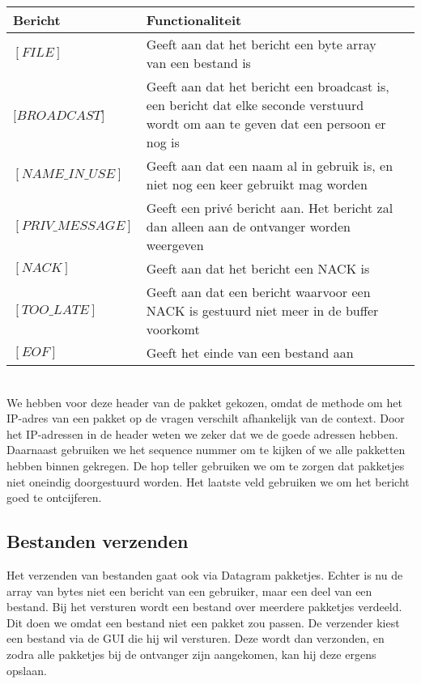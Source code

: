 \documentclass{article}
\begin{document}
\begin{tabular}{l  p{6cm}l }
Bericht & Functionaliteit \\
\hline
$[FILE]$ & Geeft aan dat het bericht een byte array van een bestand is \\
$[BROADCAST$] & Geeft aan dat het bericht een broadcast is, een bericht dat elke seconde verstuurd wordt om aan te geven dat een persoon er nog is \\
$[NAME\_IN\_USE]$ & Geeft aan dat een naam al in gebruik is, en niet nog een keer gebruikt mag worden \\
$[PRIV\_MESSAGE]$ & Geeft een priv\'{e} bericht aan. Het bericht zal dan alleen aan de ontvanger worden weergeven \\
$[NACK]$ & Geeft aan dat het bericht een NACK is \\
$[TOO\_LATE]$ & Geeft aan dat een bericht waarvoor een NACK is gestuurd niet meer in de buffer voorkomt \\
$[EOF]$ & Geeft het einde van een bestand aan
\end{tabular}
\\
We hebben voor deze header van de pakket gekozen, omdat de methode om het IP-adres van een pakket op de vragen verschilt afhankelijk van de context. Door het IP-adressen in de header weten we zeker dat we de goede adressen hebben. Daarnaast gebruiken we het sequence nummer om te kijken of we alle pakketten hebben binnen gekregen. De hop teller gebruiken we om te zorgen dat pakketjes niet oneindig doorgestuurd worden. Het laatste veld gebruiken we om het bericht goed te ontcijferen. 

\subsection{Bestanden verzenden}
Het verzenden van bestanden gaat ook via Datagram pakketjes. Echter is nu de array van bytes niet een bericht van een gebruiker, maar een deel van een bestand. Bij het versturen wordt een bestand over meerdere pakketjes verdeeld. Dit doen we omdat een bestand niet een pakket zou passen. De verzender kiest een bestand via de GUI die hij wil versturen. Deze wordt dan verzonden, en zodra alle pakketjes bij de ontvanger zijn aangekomen, kan hij deze ergens opslaan. \\
\end{document}
